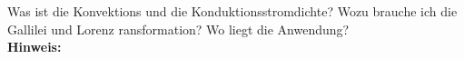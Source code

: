 \begin{question}[section=2,subsection=22,name={Stromdichte},difficulty=4,type=mdl,mode=exm,tags={}]
	Was ist die Konvektions und die Konduktionsstromdichte? Wozu brauche ich die Gallilei und Lorenz ransformation? Wo liegt die Anwendung?
	\\ \textbf{Hinweis:}\\
	
\end{question}
\begin{solution}
	
\end{solution}